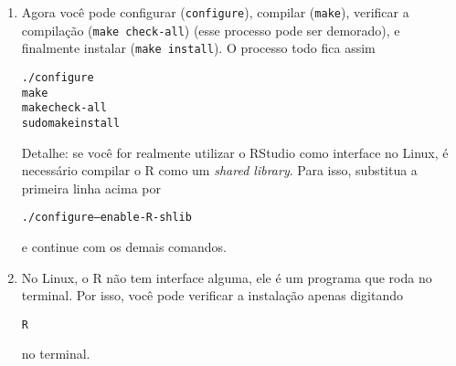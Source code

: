 \documentclass[a4paper,12pt]{article}\usepackage{graphicx, color}
\makeatletter
\newenvironment{kframe}{%
 \def\at@end@of@kframe{}%
 \ifinner\ifhmode%
  \def\at@end@of@kframe{\end{minipage}}%
  \begin{minipage}{\columnwidth}%
 \fi\fi%
 \def\FrameCommand##1{\hskip\@totalleftmargin \hskip-\fboxsep
 \colorbox{shadecolor}{##1}\hskip-\fboxsep
     \hskip-\linewidth \hskip-\@totalleftmargin \hskip\columnwidth}%
 \MakeFramed {\advance\hsize-\width
   \@totalleftmargin\z@ \linewidth\hsize
   \@setminipage}}%
 {\par\unskip\endMakeFramed%
 \at@end@of@kframe}
\newenvironment{knitrout}{}{} %
\providecommand{\R}{\textsf{R}\xspace}
\providecommand{\RStudio}{\textsf{RStudio}\xspace}
\makeatother
\begin{document}
\begin{enumerate}
  Isso irá criar um diretório chamado \texttt{R-2.15.2}. Entre nesse
  diretório
\begin{knitrout}\small
{}\color{fgcolor}\begin{kframe}
\begin{alltt}
 cd R-2.15.2
\end{alltt}
\end{kframe}
\end{knitrout}

\item Agora você pode configurar (\texttt{configure}), compilar
  (\texttt{make}), verificar a compilação (\texttt{make check-all})
  (esse processo pode ser demorado), e finalmente instalar (\texttt{make
  install}). O processo todo fica assim
\begin{knitrout}\small
{}\color{fgcolor}\begin{kframe}
\begin{alltt}
 ./configure
 make
 make check-all
 sudo make install
\end{alltt}
\end{kframe}
\end{knitrout}

  Detalhe: se você for realmente utilizar o \RStudio como interface no
  Linux, é necessário compilar o \R como um \textit{shared
    library}. Para isso, substitua a primeira linha acima por
\begin{knitrout}\small
{}\color{fgcolor}\begin{kframe}
\begin{alltt}
 ./configure --enable-R-shlib
\end{alltt}
\end{kframe}
\end{knitrout}

  e continue com os demais comandos.
\item No Linux, o \R não tem interface alguma, ele é um programa que
  roda no terminal. Por isso, você pode verificar a instalação apenas digitando
\begin{knitrout}\small
{}\color{fgcolor}\begin{kframe}
\begin{alltt}
 R
\end{alltt}
\end{kframe}
\end{knitrout}

  no terminal.
\end{enumerate}
\end{document}
